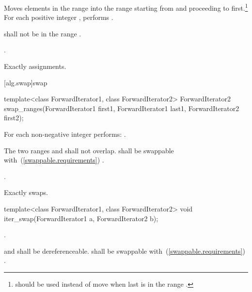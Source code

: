 \begin{itemdescr}
\pnum
\effects
Moves elements in the range 
into the
range 
starting from
and proceeding to first.\footnote{
should be used instead of move when last
is in
the range
.}
For each positive integer
,
performs
.

\pnum
\requires
{}
shall not be in the range
.

\pnum
\returns
{}.

\pnum
\complexity
Exactly
assignments.
\end{itemdescr}

[alg.swap]{swap}

%
\begin{itemdecl}
template<class ForwardIterator1, class ForwardIterator2>
  ForwardIterator2
    swap_ranges(ForwardIterator1 first1, ForwardIterator1 last1,
                ForwardIterator2 first2);
\end{itemdecl}


\begin{itemdescr}
\pnum
\effects
For each non-negative integer
performs:
.

\pnum
\requires
The two ranges 
and
shall not overlap.
 shall be swappable with~(\ref{swappable.requirements})
.

\pnum
\returns
{}.

\pnum
\complexity
Exactly
swaps.
\end{itemdescr}

%
\begin{itemdecl}
template<class ForwardIterator1, class ForwardIterator2>
  void iter_swap(ForwardIterator1 a, ForwardIterator2 b);
\end{itemdecl}


\begin{itemdescr}
\pnum
\effects
{}.

\pnum
\requires
{} and  shall be dereferenceable.  shall be
swappable with~(\ref{swappable.requirements}) .
\end{itemdescr}

